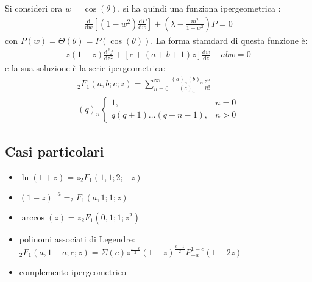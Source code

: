 Si consideri ora $w=\cos{\left(\theta\right)}$, si ha quindi una funziona ipergeometrica :
\begin{equation}\begin{split}
\frac{\textrm{d}}{\textrm{d}w}\left[\left(1-w^2\right)\frac{\textrm{d}P}{\textrm{d}w}\right]+\left(\lambda-\frac{m^2}{1-w^2}\right)P=0
\end{split}\end{equation}
con $P\left(w\right)=\Theta\left(\theta\right)=P\left(\cos{\left(\theta\right)}\right)$. La forma stamdard di questa funzione è:
\begin{equation}\begin{split}
z\left(1-z\right)\frac{\textrm{d}^2f}{\textrm{d}z^2}+\left[c+\left(a+b+1\right)z\right]\frac{\textrm{d}w}{\textrm{d}z}-abw=0
\end{split}\end{equation}
e la sua soluzione è la serie ipergeometrica:
\begin{equation}\begin{split}
_2F_1\left(a,b;c;z\right)=\sum_{n=0}^{\infty }{\frac{\left(a\right)_n\left(b\right)_n}{\left(c\right)_n}\frac{z^n}{n!}} \\
\left(q\right)_n
\begin{cases}
1, & n=0 \\
q\left(q+1\right)\dots\left(q+n-1\right), & n>0
\end{cases}
\end{split}\end{equation}

\subsection{Casi particolari} %
\begin{itemize}
\item $\ln{\left(1+z\right)}=z_2F_1\left(1,1;2;-z\right)$
\item $\left(1-z\right)^{-a}= _2F_1\left(a,1;1;z\right)$
\item $\arccos{\left(z\right)}=z _2F_1\left(0,1;1;z^2\right)$
\item polinomi associati di Legendre: $_2F_1\left(a,1-a;c;z\right)=\Sigma\left(c\right)z^{\frac{1-c}{2}}\left(1-z\right)^{\frac{c-1}{2}}P_{-a}^{1-c}\left(1-2z\right)$
\item complemento ipergeometrico %
\end{itemize}

